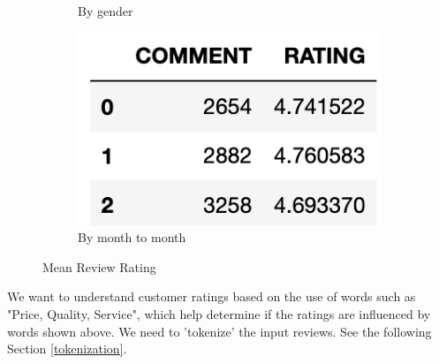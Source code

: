 \documentclass[11pt, letterpaper]{article}
\begin{document}
\begin{figure}[H]
\begin{subfigure}[b]{0.3\textwidth}
         \caption{By gender}
         \label{fig:by_gender}
     \end{subfigure}
     \hfill
     \begin{subfigure}[b]{0.3\textwidth}
         \centering
         \includegraphics[width=\textwidth]{eda_by_month.png}
         \caption{By month to month}
         \label{fig:by_month}
     \end{subfigure}
        \caption{Mean Review Rating}
        \label{fig:Review rating by various groups}
\end{figure}
We want to understand customer ratings based on the use of words such as "Price, Quality, Service", which help determine if the ratings are influenced by words shown above. We need to 'tokenize' the input reviews. See the following Section \ref{tokenization}.
\end{document}
